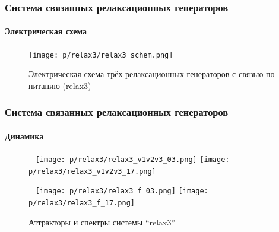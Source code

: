 \documentclass[10pt,utf8]{beamer}
\begin{document}

\begin{frame}
  \frametitle{Система связанных релаксационных генераторов}
  \framesubtitle{Электрическая схема}

  \begin{figure}[h!]
  \begin{center}
    \texttt{[image: p/relax3/relax3\_schem.png]}
  \end{center}
    \caption{Электрическая схема трёх релаксационных генераторов с связью по питанию (relax3)}
  \label{atu:f:relax3_schem}
  \end{figure}


\end{frame}




\begin{frame}
  \frametitle{Система связанных релаксационных генераторов}
  \framesubtitle{Динамика}

  \begin{figure}[h!]
    \centerline{
      {~}\hfill
      \texttt{[image: p/relax3/relax3\_v1v2v3\_03.png]}
      \hfill
      \texttt{[image: p/relax3/relax3\_v1v2v3\_17.png]}
      \hfill{~}
    }
    \centerline{
      {~}\hfill
      \texttt{[image: p/relax3/relax3\_f\_03.png]}
      \hfill
      \texttt{[image: p/relax3/relax3\_f\_17.png]}
      \hfill{~}
    }
    \caption{Аттракторы и спектры системы ``relax3''}
    \label{atu:f:relax3_dyn}
  \end{figure}



\end{frame}



\end{document}
